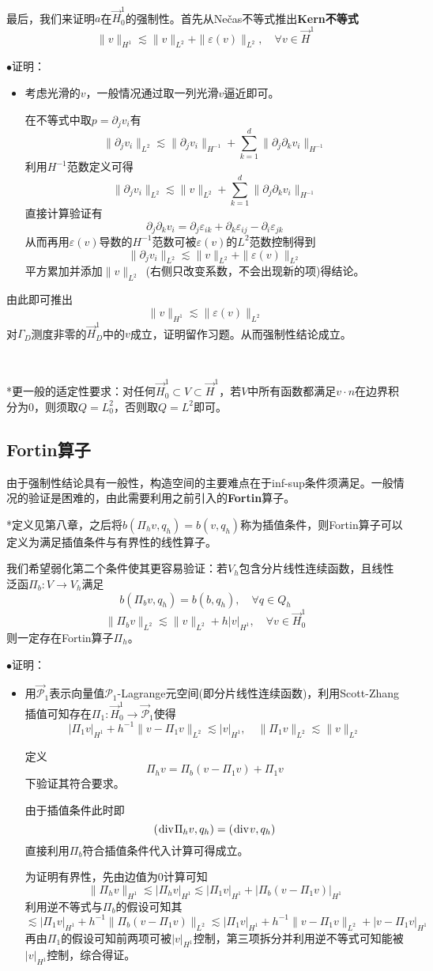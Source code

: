 \documentclass[a4paper,UTF8,fontset=windows]{ctexart}
\newcommand*{\cp}{\mathcal{P}}
\renewcommand*{\div}{\hspace{0.07em}\mathrm{div}\hspace{0.07em}}
\newcommand{\proo}[1]{{\kaishu $\bullet$证明：
\begin{itemize}
    \item[] #1
\end{itemize}
}}
\begin{document}
\

最后，我们来证明$a$在$\vec{H}_0^1$的强制性。首先从Ne\v cas不等式推出\textbf{Kern不等式}
$$\|v\|_{H^1}\lesssim\|v\|_{L^2}+\|\varepsilon(v)\|_{L^2},\quad\forall v\in\vec{H}^1$$

\proo{
    考虑光滑的$v$，一般情况通过取一列光滑$v$逼近即可。

    在不等式中取$p=\partial_jv_i$有
    $$\|\partial_jv_i\|_{L^2}\lesssim\|\partial_jv_i\|_{H^{-1}}+\sum_{k=1}^d\|\partial_j\partial_kv_i\|_{H^{-1}}$$
    利用$H^{-1}$范数定义可得
    $$\|\partial_jv_i\|_{L^2}\lesssim\|v\|_{L^2}+\sum_{k=1}^d\|\partial_j\partial_kv_i\|_{H^{-1}}$$
    直接计算验证有
    $$\partial_j\partial_kv_i=\partial_j\varepsilon_{ik}+\partial_k\varepsilon_{ij}-\partial_i\varepsilon_{jk}$$
    从而再用$\varepsilon(v)$导数的$H^{-1}$范数可被$\varepsilon(v)$的$L^2$范数控制得到
    $$\|\partial_jv_i\|_{L^2}\lesssim\|v\|_{L^2}+\|\varepsilon(v)\|_{L^2}$$
    平方累加并添加$\|v\|_{L^2}$\ (右侧只改变系数，不会出现新的项)得结论。
}

由此即可推出
$$\|v\|_{H^1}\lesssim\|\varepsilon(v)\|_{L^2}$$
对$\Gamma_D$测度非零的$\vec{H}_D^1$中的$v$成立，证明留作习题。从而强制性结论成立。

\

*更一般的适定性要求：对任何$\vec{H}_0^1\subset V\subset\vec{H}^1$，若$V$中所有函数都满足$v\cdot n$在边界积分为0，则须取$Q=L_0^2$，否则取$Q=L^2$即可。

\subsection{Fortin算子}
由于强制性结论具有一般性，构造空间的主要难点在于inf-sup条件须满足。一般情况的验证是困难的，由此需要利用之前引入的\textbf{Fortin}算子。

*定义见第八章，之后将$b(\Pi_hv,q_h)=b(v,q_h)$称为插值条件，则Fortin算子可以定义为满足插值条件与有界性的线性算子。

我们希望弱化第二个条件使其更容易验证：若$V_h$包含分片线性连续函数，且线性泛函$\Pi_b:V\to V_h$满足
$$b(\Pi_bv,q_h)=b(b,q_h),\quad\forall q\in Q_h$$
$$\|\Pi_bv\|_{L^2}\lesssim\|v\|_{L^2}+h|v|_{H^1},\quad\forall v\in\vec{H}_0^1$$
则一定存在Fortin算子$\Pi_h$。

\proo{
    用$\vec{\cp}_1$表示向量值$\cp_1$-Lagrange元空间(即分片线性连续函数)，利用Scott-Zhang插值可知存在$\Pi_1:\vec{H}_0^1\to\vec{\cp}_1$使得
    $$|\Pi_1v|_{H^1}+h^{-1}\|v-\Pi_1v\|_{L^2}\lesssim|v|_{H^1},\quad\|\Pi_1v\|_{L^2}\lesssim\|v\|_{L^2}$$

    定义
    $$\Pi_hv=\Pi_b(v-\Pi_1v)+\Pi_1v$$
    下验证其符合要求。

    由于插值条件此时即
    $$(\div\Pi_hv,q_h)=(\div v,q_h)$$
    直接利用$\Pi_b$符合插值条件代入计算可得成立。

    为证明有界性，先由边值为0计算可知
    $$\|\Pi_hv\|_{H^1}\lesssim|\Pi_hv|_{H^1}\lesssim|\Pi_1v|_{H^1}+|\Pi_b(v-\Pi_1v)|_{H^1}$$
    利用逆不等式与$\Pi_b$的假设可知其
    $$\lesssim|\Pi_1v|_{H^1}+h^{-1}\|\Pi_b(v-\Pi_1v)\|_{L^2}\lesssim|\Pi_1v|_{H^1}+h^{-1}\|v-\Pi_1v\|_{L^2}+|v-\Pi_1v|_{H^1}$$
    再由$\Pi_1$的假设可知前两项可被$|v|_{H^1}$控制，第三项拆分并利用逆不等式可知能被$|v|_{H^1}$控制，综合得证。
}
\end{document}
